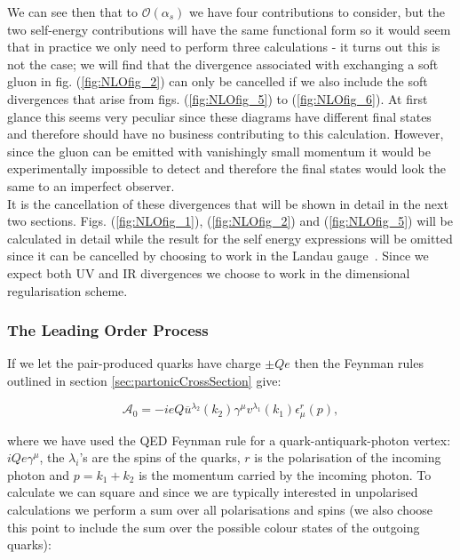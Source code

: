 		We can see then that to $\mathcal{O}(\alpha_s)$ we have four contributions to consider, but the two self-energy contributions will have
		the same functional form so it would seem that in practice we only need to perform three calculations - it turns out this is not the
		case; we will find that the divergence associated with exchanging a soft gluon in fig. (\ref{fig:NLOfig_2}) can only be cancelled
		if we also include the soft divergences that arise from figs. (\ref{fig:NLOfig_5}) to (\ref{fig:NLOfig_6}).  At first glance this
		seems very peculiar since these diagrams have different final states and therefore should have no business contributing to this
		calculation.  However, since the gluon can be emitted with vanishingly small momentum it would be experimentally impossible to
		detect and therefore the final states would look the same to an imperfect observer.\\It is the cancellation of these divergences
		that will be shown in detail in the next two sections.  Figs. (\ref{fig:NLOfig_1}), (\ref{fig:NLOfig_2}) and (\ref{fig:NLOfig_5})
		will be calculated in detail while the result for the self energy expressions will be omitted since it can be cancelled by
		choosing to work in the Landau gauge~\cite{fieldBook}.  Since we expect both UV and IR divergences we choose to work in the dimensional
		regularisation scheme.

		\subsubsection{The Leading Order Process}

			If we let the pair-produced quarks have charge $\pm Qe$ then the Feynman rules outlined in section \ref{sec:partonicCrossSection} give:

			\begin{equation}
				\mathcal{A}_0 = -ieQ\overline{u}^{\lambda_2}(k_2)\gamma^\mu v^{\lambda_1}(k_1)\epsilon^r_\mu(p),
			\end{equation}

			where we have used the QED Feynman rule for a quark-antiquark-photon vertex: $iQe\gamma^\mu$, the $\lambda_i$'s are the
			spins of the quarks, $r$ is the polarisation of the incoming photon and $p = k_1 + k_2$ is the momentum carried by the
			incoming photon.  To calculate we can square and since we are typically interested in unpolarised calculations we perform
			a sum over all polarisations and spins (we also choose this point to include the sum over the possible colour states of
			the outgoing quarks):

